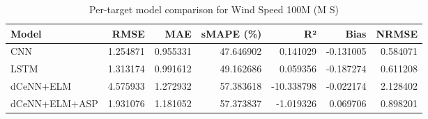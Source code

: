\begin{table}
\caption{Per-target model comparison for Wind Speed 100M (M S)}
\begin{tabular}{lrrrrrr}
\toprule
Model & RMSE & MAE & sMAPE (\%) & R² & Bias & NRMSE \\
\midrule
CNN & 1.254871 & 0.955331 & 47.646902 & 0.141029 & -0.131005 & 0.584071 \\
LSTM & 1.313174 & 0.991612 & 49.162686 & 0.059356 & -0.187274 & 0.611208 \\
dCeNN+ELM & 4.575933 & 1.272932 & 57.383618 & -10.338798 & -0.022174 & 2.128402 \\
dCeNN+ELM+ASP & 1.931076 & 1.181052 & 57.373837 & -1.019326 & 0.069706 & 0.898201 \\
\bottomrule
\end{tabular}
\end{table}
